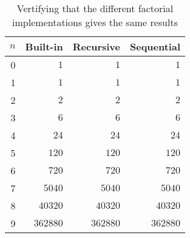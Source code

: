 \begin{table}[htp]
	\begin{center}
	\caption{Vertifying that the different factorial
implementations gives the same results}
	\label{tab:facV}
		\begin{tabular}{rrrr}
		\toprule
			{$n$} & {Built-in} & {Recursive} & {Sequential}\\
			\midrule
			{0} & $1$ & $1$ & $1$\\
			{1} & $1$ & $1$ & $1$\\
			{2} & $2$ & $2$ & $2$\\
			{3} & $6$ & $6$ & $6$\\
			{4} & $24$ & $24$ & $24$\\
			{5} & $120$ & $120$ & $120$\\
			{6} & $720$ & $720$ & $720$\\
			{7} & $5040$ & $5040$ & $5040$\\
			{8} & $40320$ & $40320$ & $40320$\\
			{9} & $362880$ & $362880$ & $362880$\\
		\bottomrule
		\end{tabular}
	\end{center}
\end{table}